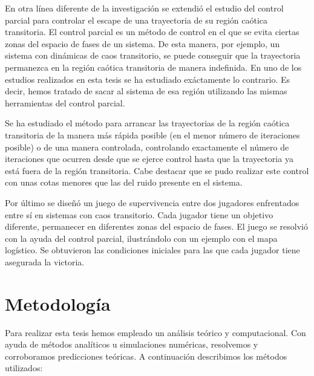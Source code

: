 En otra línea diferente de la investigación se extendió el estudio del control parcial para controlar el escape de una trayectoria de su región caótica transitoria. El control parcial es un método de control en el que se evita ciertas zonas del espacio de fases de un sistema. De esta manera, por ejemplo, un sistema con dinámicas de caos transitorio, se puede conseguir que la trayectoria permanezca en la región caótica transitoria de manera indefinida. En uno de los estudios realizados en esta tesis se ha estudiado exáctamente lo contrario. Es decir, hemos tratado de sacar al sistema de esa región utilizando las mismas herramientas del control parcial.

Se ha estudiado el método para arrancar las trayectorias de la región caótica transitoria de la manera más rápida posible (en el menor número de iteraciones posible) o de una manera controlada, controlando exactamente el número de iteraciones que ocurren desde que se ejerce control hasta que la trayectoria ya está fuera de la región transitoria. Cabe destacar que se pudo realizar este control con unas cotas menores que las del ruido presente en el sistema.

Por último se diseñó un juego de supervivencia entre dos jugadores enfrentados entre sí en sistemas con caos transitorio. Cada jugador tiene un objetivo diferente, permanecer en diferentes zonas del espacio de fases. El juego se resolvió con la ayuda del control parcial, ilustrándolo con un ejemplo con el mapa logístico. Se obtuvieron las condiciones iniciales para las que cada jugador tiene asegurada la victoria.



\section{Metodología}

Para realizar esta tesis hemos empleado un análisis teórico y computacional. Con ayuda de métodos analíticos u simulaciones numéricas, resolvemos y corroboramos predicciones teóricas. A continuación describimos los métodos utilizados:

